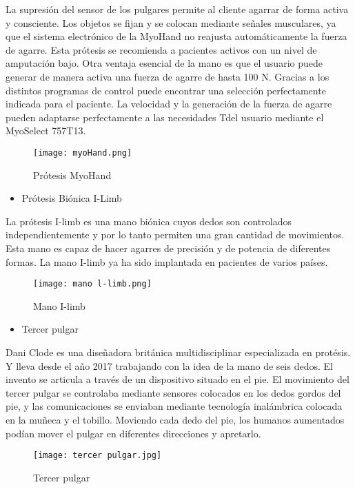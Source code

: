 \documentclass[a4paper]{article}
\begin{document}
La supresión del sensor de los pulgares permite al cliente agarrar de forma activa y consciente. Los objetos se fijan y se colocan mediante señales musculares, ya que el sistema electrónico de la MyoHand no reajusta automáticamente la fuerza de agarre. Esta prótesis se recomienda a pacientes activos con un nivel de amputación bajo. Otra ventaja esencial de la mano es que el usuario puede generar de manera activa una fuerza de agarre de hasta 100 N. Gracias a los distintos programas de control puede encontrar una selección perfectamente indicada para el paciente. La velocidad y la generación de la fuerza de agarre pueden adaptarse perfectamente a las necesidades Tdel usuario mediante el MyoSelect 757T13. 
\begin{figure}[h]
\centering
\texttt{[image: myoHand.png]}
\caption{\label{fig:biomec1}Prótesis MyoHand}
\end{figure}

\begin{itemize}
    \item Prótesis Biónica I-Limb
\end{itemize}
La prótesis I-limb es una mano biónica cuyos dedos son controlados independientemente y por lo tanto permiten una gran cantidad de movimientos. Esta mano es capaz de hacer agarres de precisión y de potencia de diferentes formas. La mano I-limb ya ha sido implantada en pacientes de varios países. 
\begin{figure}[h]
\centering
\texttt{[image: mano l-limb.png]}
\caption{\label{fig:biomec1}Mano I-limb}
\end{figure}

\begin{itemize}
    \item Tercer pulgar
\end{itemize}
Dani Clode es una diseñadora británica multidisciplinar especializada en protésis. Y lleva desde el año 2017 trabajando con la idea de la mano de seis dedos. El invento se articula a través de un dispositivo situado en el pie. El movimiento del tercer pulgar se controlaba mediante sensores colocados en los dedos gordos del pie, y las comunicaciones se enviaban mediante tecnología inalámbrica colocada en la muñeca y el tobillo. Moviendo cada dedo del pie, los humanos aumentados podían mover el pulgar en diferentes direcciones y apretarlo.
\begin{figure}[h]
\centering
\texttt{[image: tercer pulgar.jpg]}
\caption{\label{fig:biomec1}Tercer pulgar}
\end{figure}
\end{document}
